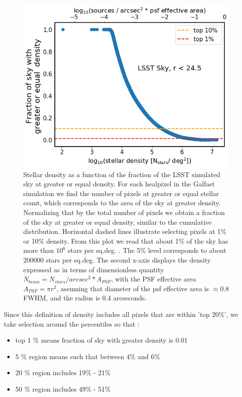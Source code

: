 \documentclass[DM,lsstdraft,toc,usenatbib]{lsstdoc}
\begin{document}
\begin{figure}
\centering
\includegraphics[width=0.7\columnwidth]{figs/02_all_sky_r_lt245.png}
\caption{Stellar density as a function of the fraction of the LSST simulated sky at greater or equal density. 
For each healpixel in the  Galfast simulation we find the number of pixels at greater or equal stellar count, which corresponds to the area of the sky at greater density.  Normalizing that by the total number of pixels we obtain a fraction of the sky at greater or equal density, similar to the cumulative distribution. Horizontal dashed lines illustrate selecting pixels at 1\% or 10\% density. From this plot we read that about 1\% of the sky has more than $10^{6}$ stars per sq.deg. . The 5\% level corresponds to about 200000 stars per sq.deg. The second x-axis displays the density expressed as in terms of dimensionless quantity  $N_{beam} = N_{stars}/{arcsec}^{2} * A_{PSF}$, with the PSF effective area $A_{PSF} = \pi r^{2}$, assuming that diameter of the psf effective area is $\approx 0.8$ FWHM, and the radius is  0.4 arcseconds. }
\label{fig:illustrate_density}
\end{figure} 


Since this definition of density includes all pixels that are within 'top 20\%', we take selection around the percentiles so that :

\begin{itemize}
\item top  1 \%  means  fraction of sky with greater density is 0.01
\item 5 \% region means such that between  4\% and 6\%
\item 20 \% region  includes   19\% - 21\%
\item 50 \% region includes 49\% - 51\% 
\end{itemize}
\end{document}
